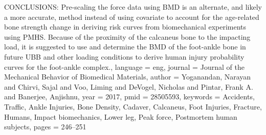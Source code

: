 {{CONCLUSIONS: Pre-scaling the force data using BMD is an alternate, and likely a more accurate, method instead of using covariate to account for the age-related bone strength change in deriving risk curves from biomechanical experiments using PMHS. Because of the proximity of the calcaneus bone to the impacting load, it is suggested to use and determine the BMD of the foot-ankle bone in future UBB and other loading conditions to derive human injury probability curves for the foot-ankle complex.},
	language = {eng},
	journal = {Journal of the Mechanical Behavior of Biomedical Materials},
	author = {Yoganandan, Narayan and Chirvi, Sajal and Voo, Liming and DeVogel, Nicholas and Pintar, Frank A. and Banerjee, Anjishnu},
	year = {2017},
	pmid = {28505593},
	keywords = {Accidents, Traffic, Ankle Injuries, Bone Density, Cadaver, Calcaneus, Foot Injuries, Fracture, Humans, Impact biomechanics, Lower leg, Peak force, Postmortem human subjects},
	pages = {246--251}
}

